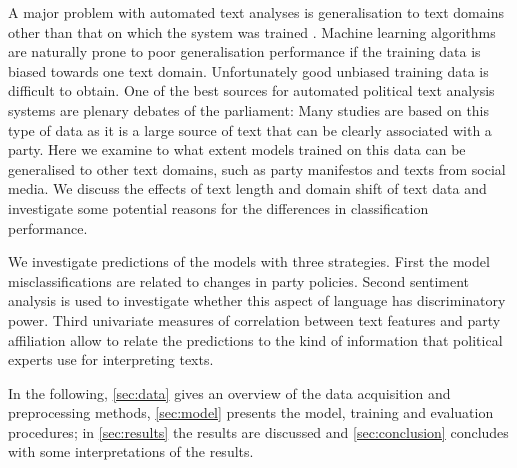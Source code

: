 \documentclass[11pt]{article}
\begin{document}
A major problem with automated text analyses is generalisation to text domains other than that on which the system was trained \cite{Slapin.2014}. 
Machine learning algorithms are naturally prone to poor generalisation performance if the training data is biased towards one text domain. Unfortunately good unbiased training data is difficult to obtain. One of the best sources for automated political text analysis systems are plenary debates of the parliament: Many studies are based on this type of data as it is a large source of text that can be clearly associated with a party. Here we examine to what extent models trained on this data can be generalised to other text domains, such as party manifestos and texts from social media. 
We discuss the effects of text length and domain shift of text data and investigate some potential reasons for the differences in classification performance. 

We investigate predictions of the models with three strategies. First the model misclassifications are related to changes in party policies. Second sentiment analysis is used to investigate whether this aspect of language has discriminatory power. Third univariate measures of correlation between text features and party affiliation allow to relate the predictions to the kind of information that political experts use for interpreting texts. 

In the following, \autoref{sec:data} gives an overview of the data acquisition and preprocessing methods, \autoref{sec:model} presents the model, training and evaluation procedures; in \autoref{sec:results} the results are discussed and \autoref{sec:conclusion} concludes with some interpretations of the results.
\end{document}
